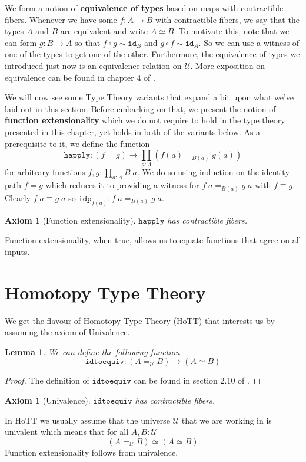 \documentclass[12pt]{report}
\newtheorem{lem}[thm]{Lemma}
\newtheorem{axiom}[thm]{Axiom}
\begin{document}
 	We form a notion of \textbf{equivalence of types} based on maps with contractible fibers. 
 	Whenever we have some $f : A\rightarrow B$ with contractible fibers, we say that the types $A$ and $B$ are equivalent and write $A \simeq B$. 
 	To motivate this, note that we can form $g : B \rightarrow A$ so that $f\circ g \sim \mathtt{id}_B$ and $g\circ f \sim \mathtt{id}_A$. 
 	So we can use a witness of one of the types to get one of the other. 
 	Furthermore, the equivalence of types we introduced just now is an equivalence relation on $\mathcal{U}$. 
 	More exposition on equivalence can be found in chapter 4 of \cite{hottbook}.

 	We will now see some Type Theory variants that expand a bit upon what we've laid out in this section. 
 	Before embarking on that, we present the notion of \textbf{function extensionality} which we do not require to hold in the type theory presented in this chapter, yet holds in both of the variants below. 
 	As a prerequisite to it, we define the function 
 	$$\mathtt{happly} : (f = g) \rightarrow \prod_{a : A}(f(a) =_{B(a)} g(a))$$
 	for arbitrary functions $f,g : \prod_{a :A}B\;a$. We do so using induction on the identity path $f = g$ which reduces it to providing a witness for $f\;a =_{B(a)} g\;a$ with $f \equiv g$. 
 	Clearly $f\;a \equiv g\;a$ so $\mathtt{idp}_{f(a)} : f\;a =_{B(a)} g\;a$. 
 	\begin{axiom}[Function extensionality] 
 	$\mathtt{happly}$ has contractible fibers. 
 	\end{axiom}
 	Function extensionality, when true, allows us to equate functions that agree on all inputs. 

\section{Homotopy Type Theory}
We get the flavour of Homotopy Type Theory (HoTT) that interests us by assuming the axiom of Univalence.
\begin{lem}
We can define the following function
$$\mathtt{idtoequiv} : (A=_\mathcal{U}B) \rightarrow (A\simeq B)$$
\end{lem}
\begin{proof}
The definition of $\mathtt{idtoequiv}$ can be found in section 2.10 of \cite{hottbook}. 
\end{proof}

\begin{axiom}[Univalence]
$\mathtt{idtoequiv}$ has contractible fibers.
\end{axiom}
In HoTT we usually assume that the universe $\mathcal{U}$ that we are working in is univalent which means that for all $A,B: \mathcal{U}$
$$(A=_\mathcal{U}B) \simeq (A \simeq B)$$
Function extensionality follows from univalence. 
\end{document}
